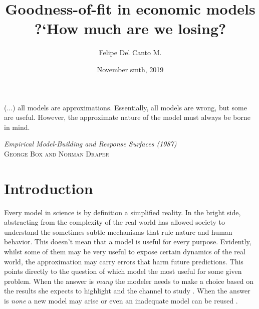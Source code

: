 \documentclass[english, a4paper,12pt]{article}
\author{Felipe Del Canto M.}
\title{Goodness-of-fit in economic models \\ ?`How much are we losing?}
\date{November smth, 2019}
\begin{document}
\maketitle
\thispagestyle{empty}


\vfill
\epigraph{(...) all models are approximations. Essentially, all models are wrong, but some are useful. However, %
the approximate nature of the model must always be borne in mind.}{\textit{Empirical Model-Building and Response Surfaces (1987)} \\ \textsc{George Box and Norman Draper}}

\vfill
{}
\vfill


\newpage
\section{Introduction}

Every model in science is by definition a simplified reality. In the bright side, abstracting from the complexity of the real world has allowed society to understand the sometimes subtle mechanisms that rule nature and human behavior. This doesn't mean that a model is useful for every purpose. Evidently, whilst some of them may be very useful to expose certain dynamics of the real world, the approximation may carry errors that harm future predictions. This points directly to the question of which model the most useful for some given problem. When the answer is \textit{many} the modeler needs to make a choice based on the results she expects to highlight and the channel to study . When the answer is \textit{none} a new model may arise or even an inadequate model can be reused . 
\end{document}
